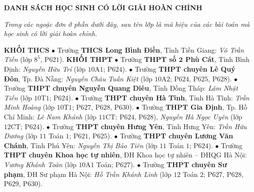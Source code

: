\begin{center}
	\textbf{\color{thachthuctoanhoc}DANH SÁCH HỌC SINH CÓ LỜI GIẢI HOÀN CHỈNH}
\end{center}
\textit{Trong các ngoặc đơn ở phần dưới đây, sau tên lớp là mã hiệu của các bài toán mà học sinh có lời giải hoàn chỉnh.}
\begin{multicols}{2}
	\textbf{\color{thachthuctoanhoc}KHỐI THCS}
	\vskip 0.05cm
	$\bullet$ Trường \textbf{\color{thachthuctoanhoc}THCS Long Bình Điền}, Tỉnh Tiền Giang: \textit{Võ Trần Tiến} (lớp $8^5$,  P$621$).
	\vskip 0.05cm
	\textbf{\color{thachthuctoanhoc}KHỐI THPT}
	\vskip 0.05cm
	$\bullet$ Trường \textbf{\color{thachthuctoanhoc}THPT số $\pmb{2}$ Phù Cát}, Tỉnh Bình Định: \textit{Nguyễn Hữu Trí} (lớp $10$A$1$; P$624$).
	\vskip 0.05cm
	$\bullet$ Trường \textbf{\color{thachthuctoanhoc}THPT chuyên Lê Quý Đôn}, Tp. Đà Nẵng: \textit{Nguyễn Châu Tuấn Kiệt} (lớp $10$A$2$; P$624$, P$625$, P$628$).
	\vskip 0.05cm
	$\bullet$ Trường \textbf{\color{thachthuctoanhoc}THPT chuyên Nguyễn Quang Diêu}, Tỉnh Đồng Tháp: \textit{Lâm Nhật Tiến} (lớp $10$T$1$; P$624$).
	\vskip 0.05cm
	$\bullet$ Trường \textbf{\color{thachthuctoanhoc}THPT chuyên Hà Tĩnh}, Tỉnh Hà Tĩnh: \textit{Trần Minh Hoàng} (lớp $10$T$1$; P$627$, P$628$, P$630$).
	\vskip 0.05cm
	$\bullet$ Trường \textbf{\color{thachthuctoanhoc}THPT Gia Định}, Tp. Hồ Chí Minh: \textit{Lê Nam Khánh} (lớp $11$CT; P$624$, P$628$), \textit{Nguyễn Hà Ngọc Uyên} (lớp $12$CT; P$624$).
	\vskip 0.05cm
	$\bullet$ Trường \textbf{\color{thachthuctoanhoc}THPT chuyên Hưng Yên}, Tỉnh Hưng Yên: \textit{Trần Hữu Dương} (lớp $11$ Toán $1$; P$621$, P$625$).
	\vskip 0.05cm
	$\bullet$ Trường \textbf{\color{thachthuctoanhoc}THPT chuyên Lương Văn Chánh}, Tỉnh Phú Yên: \textit{Nguyễn Thị Bảo Tiên} (lớp $11$ Toán $1$; P$624$).
	\vskip 0.05cm
	$\bullet$ Trường \textbf{\color{thachthuctoanhoc}THPT chuyên Khoa học tự nhiên}, ĐH Khoa học tự nhiên -- ĐHQG Hà Nội: \textit{Vương Khánh Toàn} (lớp $10$A$1$ Toán; P$627$).
	\vskip 0.05cm
	$\bullet$ Trường \textbf{\color{thachthuctoanhoc}THPT chuyên Sư phạm}, ĐH Sư phạm Hà Nội: \textit{Hồ Trần Khánh Linh} (lớp $12$ Toán $2$; P$627$, P$628$, P$629$, P$630$).
\end{multicols}

